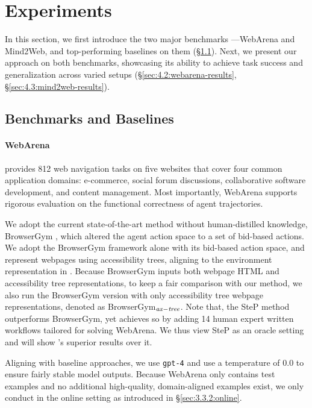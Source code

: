 \section{Experiments}
\label{sec:4:experiments}

In this section, we first introduce the two major benchmarks ---WebArena and Mind2Web, and top-performing baselines on them (\S\ref{sec:4.1:benchmark-and-baseline}). Next, we present our \awm approach on both benchmarks, showcasing its ability to achieve task success and generalization across varied setups (\S\ref{sec:4.2:webarena-results}, \S\ref{sec:4.3:mind2web-results}).


\subsection{Benchmarks and Baselines}
\label{sec:4.1:benchmark-and-baseline}

\paragraph{WebArena}
\citep{zhou2024webarena} provides 812 web navigation tasks on five websites that cover four common application domains: e-commerce, social forum discussions, collaborative software development, and content management. Most importantly, WebArena supports rigorous evaluation on the functional correctness of agent trajectories. 

We adopt the current state-of-the-art method without human-distilled knowledge, BrowserGym \citep{drouin2024workarena}, which altered the agent action space to a set of bid-based actions. We adopt the BrowserGym framework alone with its bid-based action space, and represent webpages using accessibility trees, aligning to the environment representation in \citet{zhou2024webarena}. Because BrowserGym inputs both webpage HTML and accessibility tree representations, to keep a fair comparison with our method, we also run the BrowserGym version with only accessibility tree webpage representations, denoted as BrowserGym$_{\it ax-tree}$.
%
Note that, the SteP \citep{sodhi2023heap} method outperforms BrowserGym, yet achieves so by adding 14 human expert written workflows tailored for solving WebArena. We thus view SteP as an oracle setting and will show \awm's superior results over it.


Aligning with baseline approaches, we use \texttt{gpt-4} and use a temperature of $0.0$ to ensure fairly stable model outputs.
Because WebArena only contains test examples and no additional high-quality, domain-aligned examples exist, we only conduct \awm in the online setting as introduced in \S\ref{sec:3.3.2:online}.
 



